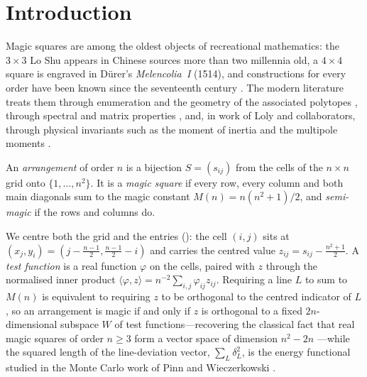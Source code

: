 \section{Introduction}
\label{sec:introduction}

Magic squares are among the oldest objects of recreational mathematics: the $3\times3$ Lo Shu appears in Chinese sources more than two millennia old, a $4\times4$ square is engraved in D\"urer's \emph{Melencolia~I} (1514), and constructions for every order have been known since the seventeenth century \cite{andrews1960magic,pickover2002zen}.
The modern literature treats them through enumeration and the geometry of the associated polytopes \cite{stanley1973magic,ehrhart1973magic,ahmed2003polyhedral,beck2006insideout,beck2010enumeration}, through spectral and matrix properties \cite{loly2009spectra,nordgren2012properties,nordgren2014spectra,cameron2013signatura}, and, in work of Loly and collaborators, through physical invariants such as the moment of inertia and the multipole moments \cite{loly2004invariance,rogers2004inertia,rogers2005multipole}.

\begin{definition}
\label{def:magic_square}
An \emph{arrangement} of order $n$ is a bijection $S=(s_{ij})$ from the cells of the $n\times n$ grid onto $\{1,\dots,n^2\}$.
It is a \emph{magic square} if every row, every column and both main diagonals sum to the magic constant $M(n)=n(n^2+1)/2$, and \emph{semi-magic} if the rows and columns do.
\end{definition}

We centre both the grid and the entries (): the cell $(i,j)$ sits at $(x_j,y_i)=(j-\frac{n-1}2,\frac{n-1}2-i)$ and carries the centred value $z_{ij}=s_{ij}-\frac{n^2+1}2$.
A \emph{test function} is a real function $\varphi$ on the cells, paired with $z$ through the normalised inner product $\langle\varphi,z\rangle=n^{-2}\sum_{i,j}\varphi_{ij}z_{ij}$.
Requiring a line $L$ to sum to $M(n)$ is equivalent to requiring $z$ to be orthogonal to the centred indicator of $L$, so an arrangement is magic if and only if $z$ is orthogonal to a fixed $2n$-dimensional subspace $W$ of test functions—recovering the classical fact that real magic squares of order $n\ge3$ form a vector space of dimension $n^2-2n$ \cite{ward1980vector}—while the squared length of the line-deviation vector, $\sum_L\delta_L^2$, is the energy functional studied in the Monte Carlo work of Pinn and Wieczerkowski \cite{pinn1998number}.


